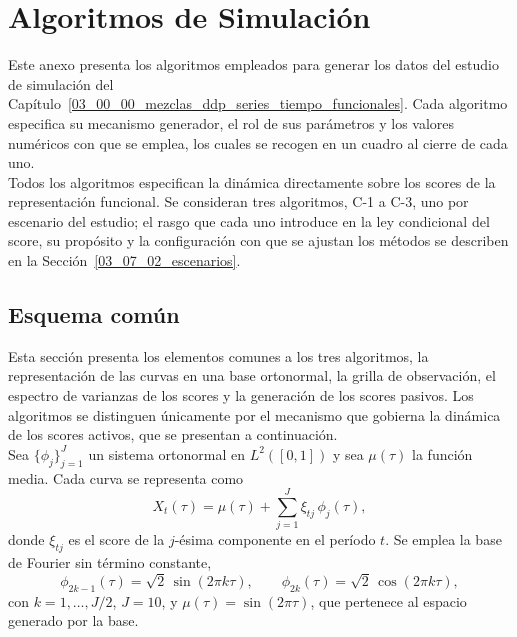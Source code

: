 \renewcommand{\appendixname}{Anexo}

\chapter{Algoritmos de Simulación}
\label{ane_00_00_anexo}
Este anexo presenta los algoritmos empleados para generar los datos del estudio de simulación del Capítulo~\ref{03_00_00_mezclas_ddp_series_tiempo_funcionales}. Cada algoritmo especifica su mecanismo generador, el rol de sus parámetros y los valores numéricos con que se emplea, los cuales se recogen en un cuadro al cierre de cada uno.\\

Todos los algoritmos especifican la dinámica directamente sobre los scores de la representación funcional. Se consideran tres algoritmos, C-1 a C-3, uno por escenario del estudio; el rasgo que cada uno introduce en la ley condicional del score, su propósito y la configuración con que se ajustan los métodos se describen en la Sección~\ref{03_07_02_escenarios}.

\section{Esquema común}
\label{ane_00_01_esquema_comun}

Esta sección presenta los elementos comunes a los tres algoritmos, la representación de las curvas en una base ortonormal, la grilla de observación, el espectro de varianzas de los scores y la generación de los scores pasivos. Los algoritmos se distinguen únicamente por el mecanismo que gobierna la dinámica de los scores activos, que se presentan a continuación.\\

Sea $\{\phi_j\}_{j=1}^{J}$ un sistema ortonormal en $L^2([0,1])$ y sea $\mu(\tau)$ la función media. Cada curva se representa como
\begin{equation}
\label{eq:ane_coef_curva}
X_t(\tau)
=
\mu(\tau)
+
\sum_{j=1}^{J}
\xi_{tj}\,\phi_j(\tau),
\end{equation}
donde $\xi_{tj}$ es el score de la $j$-ésima componente en el período $t$. Se emplea la base de Fourier sin término constante,
\begin{equation}
\label{eq:ane_fourier}
\phi_{2k-1}(\tau)=\sqrt{2}\,\sin(2\pi k\tau),
\qquad
\phi_{2k}(\tau)=\sqrt{2}\,\cos(2\pi k\tau),
\end{equation}
con $k=1,\ldots,J/2$, $J=10$, y $\mu(\tau)=\sin(2\pi\tau)$, que pertenece al espacio generado por la base.\\


